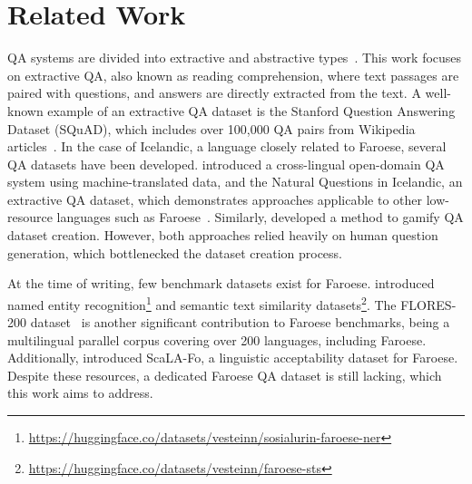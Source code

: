 \section{Related Work}
\label{sec:related_work}

QA systems are divided into extractive and abstractive types~\cite{fan-etal-2019-eli5}.
This work focuses on extractive QA, also known as reading comprehension, where text
passages are paired with questions, and answers are directly extracted from the text. A
well-known example of an extractive QA dataset is the Stanford Question Answering
Dataset (SQuAD), which includes over 100,000 QA pairs from Wikipedia
articles~\cite{rajpurkar2016squad}. In the case of Icelandic, a language closely related
to Faroese, several QA datasets have been developed.
\citet{snaebjarnarson-einarsson-2022-cross} introduced a cross-lingual open-domain QA
system using machine-translated data, and the Natural Questions in Icelandic, an
extractive QA dataset, which demonstrates approaches applicable to other low-resource
languages such as Faroese~\cite{snaebjarnarson-einarsson-2022-natural}. Similarly,
\citet{skarphedinsson-etal-2023-gameqa} developed a method to gamify QA dataset
creation. However, both approaches relied heavily on human question generation, which
bottlenecked the dataset creation process.

At the time of writing, few benchmark datasets exist for Faroese.
\citet{snaebjarnarson-etal-2023-transfer} introduced named entity
recognition\footnote{\url{https://huggingface.co/datasets/vesteinn/sosialurin-faroese-ner}}
and semantic text similarity
datasets\footnote{\url{https://huggingface.co/datasets/vesteinn/faroese-sts}}. The
FLORES-200 dataset~\cite{nllb2022} is another significant contribution to Faroese
benchmarks, being a multilingual parallel corpus covering over 200 languages, including
Faroese. Additionally, \citet{nielsen2023scandeval} introduced ScaLA-Fo, a linguistic
acceptability dataset for Faroese. Despite these resources, a dedicated Faroese QA
dataset is still lacking, which this work aims to address.